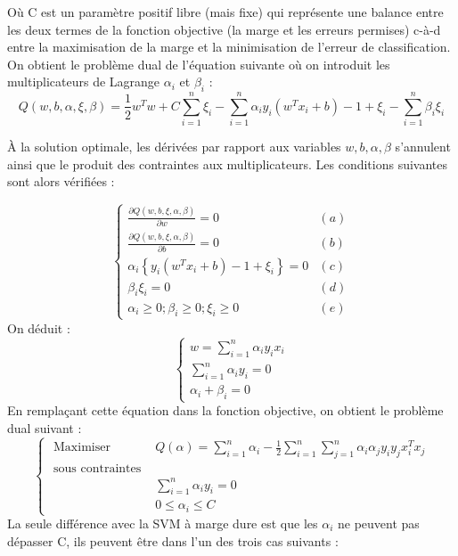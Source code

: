 \documentclass[12pt,a4paper]{report}
\begin{document}
Où $\mathrm{C}$ est un paramètre positif libre (mais fixe) qui représente une balance entre les deux termes de la fonction objective (la marge et les erreurs permises) c-à-d entre la maximisation de la marge et la minimisation de l'erreur de classification. On obtient le problème dual de l'équation suivante où on introduit les multiplicateurs de Lagrange $\alpha_{i}$ et $\beta_{i}$ :
$$
Q(w, b, \alpha, \xi, \beta)=\frac{1}{2} w^{T} w+C \sum_{i=1}^{n} \xi_{i}-\sum_{i=1}^{n} \alpha_{i} y_{i}\left(w^{T} x_{i}+b\right)-1+\xi_{i}-\sum_{i=1}^{n} \beta_{i} \xi_{i}
$$

À la solution optimale, les dérivées par rapport aux variables $w, b, \alpha, \beta$ s'annulent ainsi que le produit des contraintes aux multiplicateurs. Les conditions suivantes sont alors vérifiées :

$$
\begin{cases}\frac{\partial Q(w, b, \xi, \alpha, \beta)}{\partial w}=0 & (a) \\ \frac{\partial Q(w, b, \xi, \alpha, \beta)}{\partial b}=0 & (b) \\ \alpha_{i}\left\{y_{i}\left(w^{T} x_{i}+b\right)-1+\xi_{i}\right\}=0 & (c) \\ \beta_{i} \xi_{i}=0 & (d) \\ \alpha_{i} \geq 0 ; \beta_{i} \geq 0 ; \xi_{i} \geq 0 & (e)\end{cases}
$$
On déduit :
$$
\left\{\begin{array}{l}
	w=\sum_{i=1}^{n} \alpha_{i} y_{i} x_{i} \\
	\sum_{i=1}^{n} \alpha_{i} y_{i}=0 \\
	\alpha_{i}+\beta_{i}=0
\end{array}\right.
$$
En remplaçant cette équation dans la fonction objective, on obtient le problème dual suivant :
$$
\begin{cases}\text { Maximiser } & Q(\alpha)=\sum_{i=1}^{n} \alpha_{i}-\frac{1}{2} \sum_{i=1}^{n} \sum_{j=1}^{n} \alpha_{i} \alpha_{j} y_{i} y_{j} x_{i}^{T} x_{j} \\ \text { sous contraintes } & \\ & \sum_{i=1}^{n} \alpha_{i} y_{i}=0 \\ & 0 \leq \alpha_{i} \leq C\end{cases}
$$
La seule différence avec la SVM à marge dure est que les $\alpha_{i}$ ne peuvent pas dépasser C, ils peuvent être dans l'un des trois cas suivants :
\end{document}
